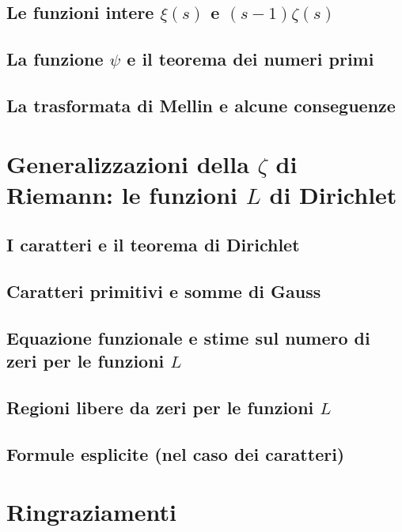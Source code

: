 \documentclass{article}
\begin{document}
\subsection{Le funzioni intere $\xi(s)$ e $(s-1)\zeta(s)$}


\subsection{La funzione $\psi$ e il teorema dei numeri primi}


\subsection{La trasformata di Mellin e alcune conseguenze}


\newpage

\section{Generalizzazioni della $\zeta$ di Riemann: le funzioni $L$ di Dirichlet}

\subsection{I caratteri e il teorema di Dirichlet}


\subsection{Caratteri primitivi e somme di Gauss}


\subsection{Equazione funzionale e stime sul numero di zeri per le funzioni $L$}


\subsection{Regioni libere da zeri per le funzioni $L$}


\subsection{Formule esplicite (nel caso dei caratteri)}


\newpage



\section*{Ringraziamenti}

\end{document}
